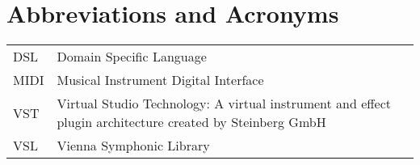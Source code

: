 \chapter*{Abbreviations and Acronyms}


\noindent
\begin{longtable}{@{}p{}p{}@{}}
DSL & Domain Specific Language \\
MIDI & Musical Instrument Digital Interface \\
VST & Virtual Studio Technology: A virtual instrument and effect plugin architecture created by Steinberg GmbH \\
VSL & Vienna Symphonic Library

\end{longtable}
